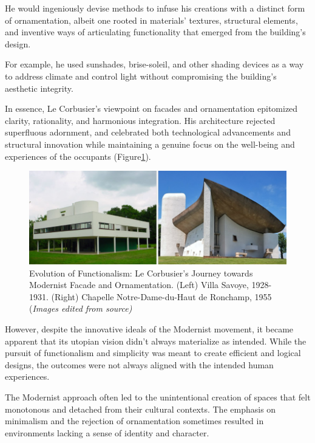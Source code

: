 He would ingeniously devise methods to infuse his creations with a distinct form of ornamentation, albeit one rooted in materials' textures, structural elements, and inventive ways of articulating functionality\cite{Saglam2014} that emerged from the building's design.

For example, he used sunshades, brise-soleil, and other shading devices as a way to address climate and control light without compromising the building's aesthetic integrity.

In essence, Le Corbusier's viewpoint on facades and ornamentation epitomized clarity, rationality, and harmonious integration.
His architecture rejected superfluous adornment, and celebrated both technological advancements and structural innovation while maintaining a genuine focus on the well-being and experiences of the occupants (Figure\ref{fig:Modernistfacade}).

     \begin{figure}[htb]
          \centering
          \includegraphics[width= \linewidth]{Images/ModernistFacade}
          \caption{Evolution of Functionalism: Le Corbusier's Journey towards Modernist Facade and Ornamentation. (Left) Villa Savoye, 1928-1931. (Right) Chapelle Notre-Dame-du-Haut de Ronchamp, 1955 (\textit{Images edited from source)}}
          \label{fig:Modernistfacade}
        \end{figure}



However, despite the innovative ideals of the Modernist movement,  it became apparent that its utopian vision didn't always materialize as intended.
While the pursuit of functionalism and simplicity was meant to create efficient and logical designs, the outcomes were not always aligned with the intended human experiences.

The Modernist approach often led to the unintentional creation of spaces that felt monotonous and detached from their cultural contexts.
The emphasis on minimalism and the rejection of ornamentation sometimes resulted in environments lacking a sense of identity and character.

